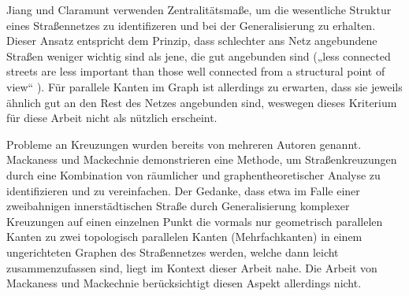 \documentclass[../main/thesis.tex]{subfiles}
\begin{document}
Jiang und Claramunt verwenden Zentralitätsmaße, um die wesentliche Struktur eines Straßennetzes zu identifizeren und bei der Generalisierung zu erhalten.
Dieser Ansatz entspricht dem Prinzip, dass schlechter ans Netz angebundene Straßen weniger wichtig sind als jene, die gut angebunden sind („less connected streets are less important than those well connected from a structural point of view“ ). 
Für parallele Kanten im Graph ist allerdings zu erwarten, dass sie jeweils ähnlich gut an den Rest des Netzes angebunden sind, weswegen dieses Kriterium für diese Arbeit nicht als nützlich erscheint.


Probleme an Kreuzungen wurden bereits von mehreren Autoren genannt.
Mackaness und Mackechnie demonstrieren eine Methode, um Straßenkreuzungen durch eine Kombination von räumlicher und graphentheoretischer Analyse zu identifizieren und zu vereinfachen. 
Der Gedanke, dass etwa im Falle einer zweibahnigen innerstädtischen Straße durch Generalisierung komplexer Kreuzungen auf einen einzelnen Punkt die vormals nur geometrisch parallelen Kanten zu zwei topologisch parallelen Kanten (Mehrfachkanten) in einem ungerichteten Graphen des Straßennetzes werden, welche dann leicht zusammenzufassen sind, liegt im Kontext dieser Arbeit nahe.
Die Arbeit von Mackaness und Mackechnie berücksichtigt diesen Aspekt allerdings nicht.







\onlyinsubfile{\listoffigures} %
\onlyinsubfile{}
\end{document}
